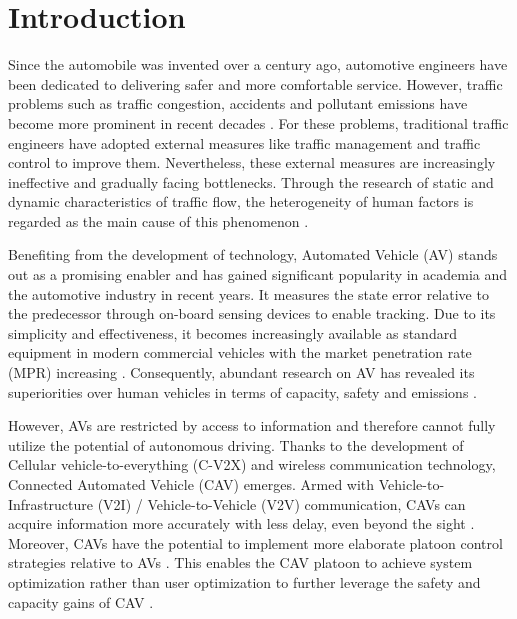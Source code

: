 \documentclass[a4paper]{cas-sc}
\begin{document}
\maketitle

\section{Introduction}
\label{Section 1}
Since the automobile was invented over a century ago, automotive engineers have been dedicated to delivering safer and more comfortable service. However, traffic problems such as traffic congestion, accidents and pollutant emissions have become more prominent in recent decades \citep{schrank_urban_2019,Jin2016,ruan_impacts_2022}. For these problems, traditional traffic engineers have adopted external measures like traffic management and traffic control to improve them. Nevertheless, these external measures are increasingly ineffective and gradually facing bottlenecks. Through the research of static and dynamic characteristics of traffic flow, the heterogeneity of human factors is regarded as the main cause of this phenomenon \citep{Zhong2020,Arem2016,Ye2018,Ruan2021}.

Benefiting from the development of technology, Automated Vehicle (AV) stands out as a promising enabler and has gained significant popularity in academia and the automotive industry in recent years. It measures the state error relative to the predecessor through on-board sensing devices to enable tracking. Due to its simplicity and effectiveness, it becomes increasingly available as standard equipment in modern commercial vehicles with the market penetration rate (MPR) increasing \citep{Wilson2011,Wilson2008}. Consequently, abundant research on AV has revealed its superiorities over human vehicles in terms of capacity, safety and emissions \citep{goni-ros_using_2019,Nikolos2015,kesting_enhanced_2010}.

However, AVs are restricted by access to information and therefore cannot fully utilize the potential of autonomous driving. Thanks to the development of Cellular vehicle-to-everything (C-V2X) and wireless communication technology, Connected Automated Vehicle (CAV) emerges. Armed with Vehicle-to-Infrastructure (V2I) / Vehicle-to-Vehicle (V2V) communication, CAVs can acquire information more accurately with less delay, even beyond the sight \citep{Navas2019,Zhou2021}. Moreover, CAVs have the potential to implement more elaborate platoon control strategies relative to AVs \citep{Dey2015,zheng_stability_2015}. This enables the CAV platoon to achieve system optimization rather than user optimization to further leverage the safety and capacity gains of CAV \citep{Ghiasi2017,li_deployment_2020}.
\end{document}

